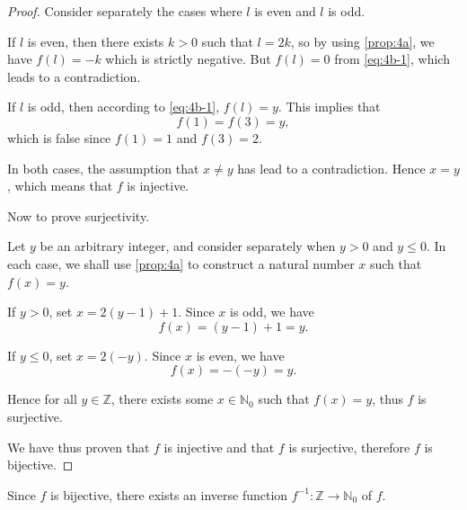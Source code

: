 \begin{enumerate}
\begin{enumerate}
\begin{proof}
                    Consider separately the cases where $l$ is even and $l$ is odd.

                    \smallskip

                    If $l$ is even, then there exists $k > 0$ such that $l = 2k$, so by using \cref{prop:4a}, we have $f(l) = -k$ which is strictly negative.
                    But $f(l) = 0$ from \cref{eq:4b-1}, which leads to a contradiction.

                    \smallskip

                    If $l$ is odd, then according to \cref{eq:4b-1}, $f(l) = y$.
                    This implies that
                    \[ f(1) = f(3) = y, \]
                    which is false since $f(1) = 1$ and $f(3) = 2$.

                    In both cases, the assumption that $x \ne y$ has lead to a contradiction.
                    Hence $x = y$, which means that $f$ is injective.

                    \medskip

                    Now to prove surjectivity.

                    Let $y$ be an arbitrary integer, and consider separately when $y > 0$ and $y \le 0$.
                    In each case, we shall use \cref{prop:4a} to construct a natural number $x$ such that $f(x) = y$.

                    \smallskip

                    If $y > 0$, set $x = 2(y - 1) + 1$.
                    Since $x$ is odd, we have
                    \[ f(x) = (y - 1) + 1 = y. \]

                    \smallskip

                    If $y \le 0$, set $x = 2(-y)$.
                    Since $x$ is even, we have
                    \[ f(x) = -(-y) = y. \]

                    \smallskip

                    Hence for all $y \in \mathbb{Z}$, there exists some $x \in \mathbb{N}_0$ such that $f(x) = y$, thus $f$ is surjective.

                    \smallskip

                    We have thus proven that $f$ is injective and that $f$ is surjective, therefore $f$ is bijective.
                \end{proof}

                \bigskip

                Since $f$ is bijective, there exists an inverse function $f^{-1}: \mathbb{Z} \to \mathbb{N}_0$ of $f$.


\end{enumerate}
\end{enumerate}
